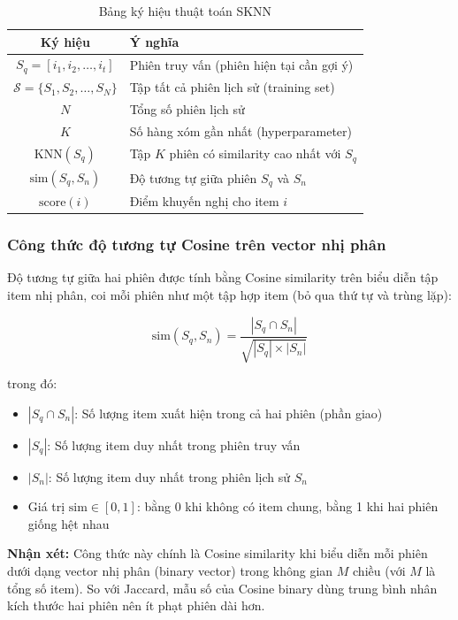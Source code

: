 \documentclass[12pt, a4paper]{article}
\begin{document}
\begin{table}[H]
\centering
\caption{Bảng ký hiệu thuật toán SKNN}
\label{tab:sknn_notation}
\begin{tabular}{cl}
\toprule
\textbf{Ký hiệu} & \textbf{Ý nghĩa} \\
\midrule
$S_q = [i_1, i_2, \ldots, i_t]$ & Phiên truy vấn (phiên hiện tại cần gợi ý) \\
$\mathcal{S} = \{S_1, S_2, \ldots, S_N\}$ & Tập tất cả phiên lịch sử (training set) \\
$N$ & Tổng số phiên lịch sử \\
$K$ & Số hàng xóm gần nhất (hyperparameter) \\
$\text{KNN}(S_q)$ & Tập $K$ phiên có similarity cao nhất với $S_q$ \\
$\text{sim}(S_q, S_n)$ & Độ tương tự giữa phiên $S_q$ và $S_n$ \\
$\text{score}(i)$ & Điểm khuyến nghị cho item $i$ \\
\bottomrule
\end{tabular}
\end{table}

\subsubsection{Công thức độ tương tự Cosine trên vector nhị phân}

Độ tương tự giữa hai phiên được tính bằng Cosine similarity trên biểu diễn tập item nhị phân, coi mỗi phiên như một tập hợp item (bỏ qua thứ tự và trùng lặp):

\begin{equation}
\boxed{
    \text{sim}(S_q, S_n) = \frac{|S_q \cap S_n|}{\sqrt{|S_q| \times |S_n|}}
}
\label{eq:sknn_sim}
\end{equation}

trong đó:
\begin{itemize}
    \item $|S_q \cap S_n|$: Số lượng item xuất hiện trong cả hai phiên (phần giao)
    \item $|S_q|$: Số lượng item duy nhất trong phiên truy vấn
    \item $|S_n|$: Số lượng item duy nhất trong phiên lịch sử $S_n$
    \item Giá trị $\text{sim} \in [0, 1]$: bằng 0 khi không có item chung, bằng 1 khi hai phiên giống hệt nhau
\end{itemize}

\textbf{Nhận xét:} Công thức này chính là Cosine similarity khi biểu diễn mỗi phiên dưới dạng vector nhị phân (binary vector) trong không gian $M$ chiều (với $M$ là tổng số item). So với Jaccard, mẫu số của Cosine binary dùng trung bình nhân kích thước hai phiên nên ít phạt phiên dài hơn.
\end{document}
